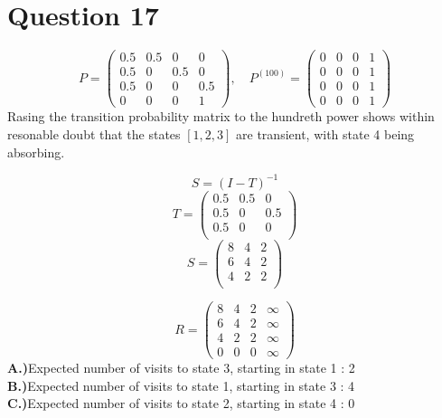 \documentclass{article}
\begin{document}
  \section*{Question 17}
  \[P = \left( \begin{array}{rrrr}
  0.5 & 0.5 &   0 &   0 \\
  0.5 &   0 & 0.5 &   0 \\
  0.5 &   0 &   0 & 0.5 \\
    0 &   0 &   0 &   1
  \end{array}\right), \quad P^{(100)} =  \left( \begin{array}{rrrr}
  0 &   0 &   0 &   1 \\
  0 &   0 &   0 &   1 \\
  0 &   0 &   0 &   1 \\
  0 &   0 &   0 &   1
  \end{array}\right) \]
  Rasing the transition probability matrix to the hundreth power shows within
  resonable doubt that the states $[1,2,3]$ are transient, with state 4 being absorbing. 
  
  \[S = (I - T)^{-1}\]
  \[T=  \left( \begin{array}{rrr}
  0.5 & 0.5 &   0  \\
  0.5 &   0 & 0.5  \\
  0.5 &   0 &   0  \\
  \end{array}\right)\]
  \[S = \left( \begin{array}{rrr}
  8 & 4 & 2  \\
  6 & 4 & 2  \\
  4 & 2 & 2  \\
  \end{array}\right) \]
  
  \[R =\left( \begin{array}{rrrr}
  8 & 4 & 2 & \infty \\
  6 & 4 & 2 & \infty \\
  4 & 2 & 2 & \infty \\
  0 & 0 & 0 & \infty 
  \end{array}\right)\]
  \textbf{A.)}Expected number of visits to state 3, starting in state 1 : 2
  \\\textbf{B.)}Expected number of visits to state 1, starting in state 3 : 4
  \\\textbf{C.)}Expected number of visits to state 2, starting in state 4 : 0
\end{document}
